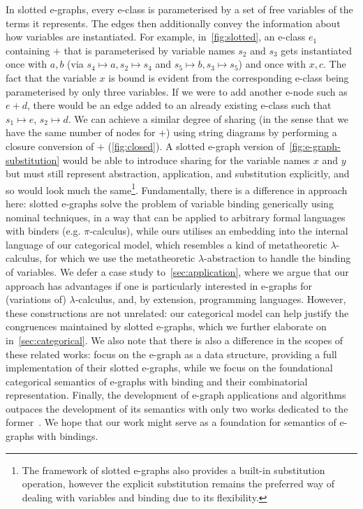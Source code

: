 In slotted e-graphs, every e-class is parameterised by a set of free variables of the terms it represents.
The edges then additionally convey the information about how variables are instantiated.
For example, in~\autoref{fig:slotted}, an e-class $e_1$ containing $+$ that is parameterised by variable names $s_2$ and $s_3$ gets instantiated once with $a,b$ (via $s_4 \mapsto a, s_2 \mapsto s_4$ and $s_5 \mapsto b, s_3 \mapsto s_5$) and once with $x,c$.
The fact that the variable $x$ is bound is evident from the corresponding e-class being parameterised by only three variables.
If we were to add another e-node such as $e + d$, there would be an edge added to an already existing e-class such that $s_1 \mapsto e$, $s_2 \mapsto d$.
We can achieve a similar degree of sharing (in the sense that we have the same number of nodes for $+$) using string diagrams by performing a closure conversion of $+$ (\autoref{fig:closed}).
A slotted e-graph version of~\autoref{fig:e-graph-substitution} would be able to introduce sharing for the variable names $x$ and $y$ but must still represent abstraction, application, and substitution explicitly, and so would look much the same\footnote{The framework of slotted e-graphs also provides a built-in substitution operation, however the explicit substitution remains the preferred way of dealing with variables and binding due to its flexibility.}.
Fundamentally, there is a difference in approach here: slotted e-graphs solve the problem of variable binding generically using nominal techniques, in a way that can be applied to arbitrary formal languages with binders (e.g. $\pi$-calculus), while ours utilises an embedding into the internal language of our categorical model, which resembles a kind of metatheoretic $\lambda$-calculus, for which we use the metatheoretic $\lambda$-abstraction to handle the binding of variables.
We defer a case study to~\autoref{sec:application}, where we argue that our approach has advantages if one is particularly interested in e-graphs for (variations of) $\lambda$-calculus, and, by extension, programming languages.
However, these constructions are not unrelated: our categorical model can help justify the congruences maintained by slotted e-graphs, which we further elaborate on in~\autoref{sec:categorical}.
We also note that there is also a difference in the scopes of these related works: \citet{slotted-egraphs} focus on the e-graph as a data structure, providing a full implementation of their slotted e-graphs, while we focus on the foundational categorical semantics of e-graphs with binding and their combinatorial representation.
Finally, the development of e-graph applications and algorithms outpaces the development of its semantics with only two works dedicated to the former~\cite{zhang_relational_2022,tree_automata_e_graphs}.
We hope that our work might serve as a foundation for semantics of e-graphs with bindings.


